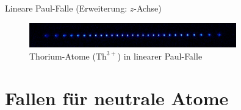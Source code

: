 \documentclass[12pt,xcolor=dvipsnames]{beamer}
\begin{document}
\begin{frame}{Lineare Paul-Falle (Erweiterung: $z$-Achse)}
	\vspace{0.2cm}
		
	\begin{figure}[h]
		\centering
		\includegraphics[width=0.8\textwidth]{./figures/29_laser_cooled_ion_chain.jpg}
		\caption{Thorium-Atome ($\mathrm{Th}^{3+}$) in linearer Paul-Falle \cite{campbell}}
	\end{figure}
	
\end{frame}

%
%

\section{Fallen für neutrale Atome}
\end{document}
